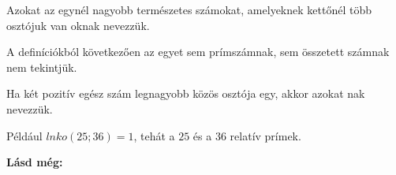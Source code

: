 \begin{defin}
Azokat az egynél nagyobb természetes számokat, amelyeknek kettőnél több
osztójuk van oknak nevezzük.
\end{defin}

\begin{corollary}
A definíciókból következően az egyet sem prímszámnak, sem összetett számnak nem
tekintjük.
\end{corollary}

\begin{defin}
Ha két pozitív egész szám legnagyobb közös osztója egy, akkor azokat
nak nevezzük.

Például $lnko(25; 36) = 1$, tehát a $25$ és a $36$ relatív prímek.
\end{defin}

\textbf{Lásd még:}
